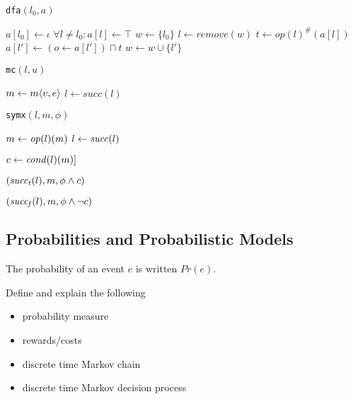 \noindent\begin{minipage}[t]{0.32\textwidth}
\begin{algorithm}[H]
\renewcommand{\algorithmicindent}{0.6em}
\caption{{\tt dfa}$(l_0,a)$}
\label{alg-dfa}
\begin{algorithmic}
 \STATE $a[l_0] \gets \iota$
 \STATE $\forall l \not= l_0 : a[l] \gets \top$
 \STATE $w \gets \{l_0\}$
   \STATE $l \gets remove(w)$
   \STATE $t \gets {op(l)}^{\#}(a[l])$
     \STATE $a[l'] \gets (o \gets a[l']) \sqcap t$
       \STATE $w \gets w \cup \{l'\}$
     \ENDIF
   \ENDFOR
 \ENDWHILE
\end{algorithmic}
\end{algorithm}
\end{minipage}%
\hfill
\begin{minipage}[t]{0.32\textwidth}
\begin{algorithm}[H]
\renewcommand{\algorithmicindent}{0.6em}
\caption{{\tt mc}$(l,u)$}
\label{alg-mc}
\begin{algorithmic}
   \STATE $m \gets m\langle v, e\rangle$
   \STATE $l \gets succ(l)$
 \ENDWHILE
\end{algorithmic}
\end{algorithm}
\end{minipage}%
\hfill
\begin{minipage}[t]{0.32\textwidth}
\begin{algorithm}[H]
\renewcommand{\algorithmicindent}{0.6em}
\caption{{\tt symx}$(l,m,\phi)$}
\label{alg-symexe}
\begin{algorithmic}
   \STATE $m \gets \mathit{op}(l)(m)$
   \STATE $l \gets \mathit{succ}(l)$
 \ENDWHILE

 \STATE $c \gets \mathit{cond}(l)(m)]$

   $(\mathit{succ_t}(l), m, \phi \wedge c)$
 \ENDIF

   $(\mathit{succ_f}(l), m, \phi \wedge \neg c)$
 \ENDIF
\end{algorithmic}
\end{algorithm}
\end{minipage}

\subsection{Probabilities and Probabilistic Models}
The probability of an event $e$ is written $Pr(e)$.

Define and explain the following
\begin{itemize}
\item probability measure
\item rewards/costs
\item discrete time Markov chain
\item discrete time Markov decision process
\end{itemize}

